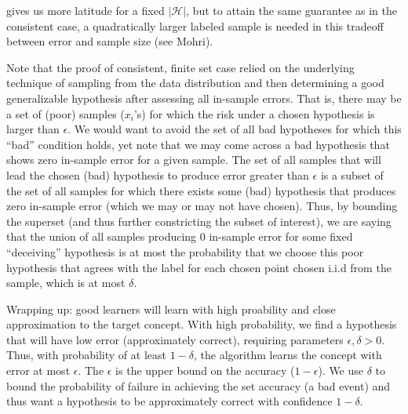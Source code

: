 gives us more latitude for a fixed $|\mathcal{H}|$, but to attain the same
guarantee as in the consistent case, a quadratically larger labeled sample is
needed in this tradeoff between error and sample size (see Mohri).\par
Note that the proof of consistent, finite set case relied on the underlying technique of sampling from the
data distribution and then determining a good generalizable hypothesis after
assessing all in-sample errors. That is,
there may be a set of (poor) samples ($x_i$'s) for which the risk under a
chosen hypothesis is larger than $\epsilon$. We would want to avoid the set of
all bad hypotheses
for which this ``bad'' condition holds, yet note that we may come across a bad
hypothesis that shows zero in-sample error for a given sample. The set of all
samples that will lead the
chosen (bad) hypothesis to produce error greater than $\epsilon$ is a subset of
the set of all samples for which there exists some (bad) hypothesis that
produces zero in-sample error (which we may or may not have chosen). Thus, by
bounding the
superset (and thus further constricting the subset of interest), we are saying
that
the union of all samples producing 0 in-sample error for some fixed
``deceiving'' hypothesis
is at most the probability that we choose this poor hypothesis that agrees with
the label for each chosen point
chosen i.i.d from the sample, which is at most $\delta$.\par
Wrapping up: good learners will learn with high proability and close
approximation to the
target concept. With high probability, we find a hypothesis that will have low
error (approximately correct), requiring parameters $\epsilon, \delta > 0$.
Thus, with probability of at least $1-\delta$, the algorithm learns the concept
with error at most $\epsilon$. The $\epsilon$ is the upper bound on the
accuracy ($1-\epsilon$). We use $\delta$ to bound the probability of failure in
achieving the set accuracy (a bad event) and thus want a hypothesis to be
approximately correct with confidence $1-\delta$.\par

